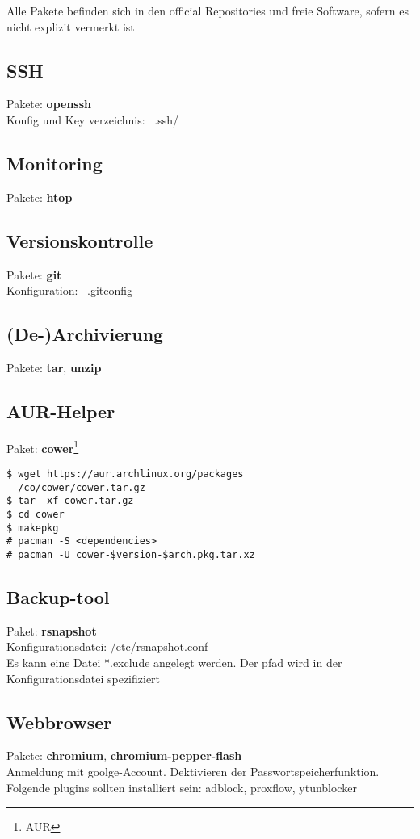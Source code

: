 Alle Pakete befinden sich in den official Repositories und freie Software,
sofern es nicht explizit vermerkt ist

\subsection{SSH}
Pakete: \textbf{openssh} \\
Konfig und Key verzeichnis: ~.ssh/

\subsection{Monitoring}
Pakete: \textbf{htop} 

\subsection{Versionskontrolle}
Pakete: \textbf{git} \\
Konfiguration: ~.gitconfig


\subsection{(De-)Archivierung}
Pakete: \textbf{tar}, \textbf{unzip} 

\subsection{AUR-Helper}
Paket: \textbf{cower}\footnote{AUR} 
\begin{lstlisting}[style=Bash]
$ wget https://aur.archlinux.org/packages 
  /co/cower/cower.tar.gz
$ tar -xf cower.tar.gz
$ cd cower
$ makepkg
# pacman -S <dependencies>
# pacman -U cower-$version-$arch.pkg.tar.xz
\end{lstlisting}

\subsection{Backup-tool}
Paket: \textbf{rsnapshot} \\ 
Konfigurationsdatei: /etc/rsnapshot.conf \\
Es kann eine Datei *.exclude angelegt werden.
Der pfad wird in der Konfigurationsdatei spezifiziert

\subsection{Webbrowser}
Pakete: \textbf{chromium}, \textbf{chromium-pepper-flash} \\ 
Anmeldung mit goolge-Account.
Dektivieren der Passwortspeicherfunktion.
Folgende plugins sollten installiert sein:
adblock, proxflow, ytunblocker

